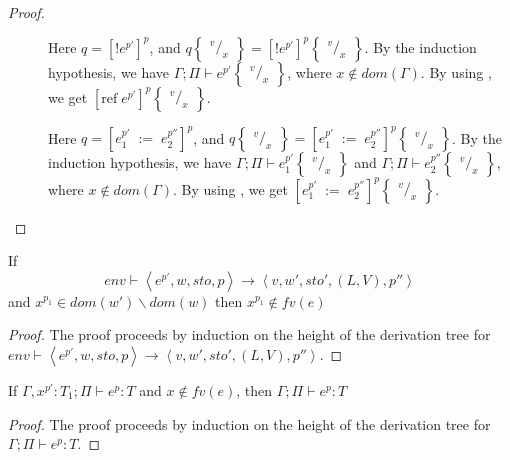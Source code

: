 \documentclass[../../master.tex]{subfiles}
\begin{document}
\begin{proof}
\begin{description}
		\item[] Here $q=[!e^{p'}]^{p}$, and $q\begin{Bmatrix} ^v/_x \end{Bmatrix}=[!e^{p'}]^{p}\begin{Bmatrix} ^v/_x \end{Bmatrix}$.
		By the induction hypothesis, we have $\Gamma;\Pi\vdash e^{p'}\begin{Bmatrix} ^v/_x \end{Bmatrix}$, where $x\notin dom(\Gamma)$.
		By using , we get $[\mbox{ref}\;e^{p'}]^{p}\begin{Bmatrix} ^v/_x \end{Bmatrix}$.

		\item[] Here $q=[e_1^{p'}\;:=\;e_2^{p''}]^{p}$, and $q\begin{Bmatrix} ^v/_x \end{Bmatrix}=[e_1^{p'}\;:=\;e_2^{p''}]^{p}\begin{Bmatrix} ^v/_x \end{Bmatrix}$.
		By the induction hypothesis, we have $\Gamma;\Pi\vdash e_1^{p'}\begin{Bmatrix} ^v/_x \end{Bmatrix}$ and $\Gamma;\Pi\vdash e_2^{p''}\begin{Bmatrix} ^v/_x \end{Bmatrix}$, where $x\notin dom(\Gamma)$.
		By using , we get $[e_1^{p'}\;:=\;e_2^{p''}]^{p}\begin{Bmatrix} ^v/_x \end{Bmatrix}$.
	\end{description}
\end{proof}
\fi

\begin{lemma}[History]\label{lemma:His}
	If 
	$$env\vdash\left\langle e^{p'},w,sto,p\right\rangle\rightarrow\left\langle v,w',sto',(L,V),p''\right\rangle$$
		and $x^{p_1}\in dom(w')\backslash dom(w)$ then $x^{p_1}\notin fv(e)$
\end{lemma}
\begin{proof}
	The proof proceeds by induction on the height of the derivation tree for $env\vdash\left\langle e^{p'},w,sto,p\right\rangle\rightarrow\left\langle v,w',sto',(L,V),p''\right\rangle$.
\end{proof}

\begin{lemma}[Strengthening]\label{lemma:Strength}
	If $\Gamma,x^{p'}:T_1;\Pi\vdash e^{p}:T$ and $x\notin fv(e)$, then $\Gamma;\Pi\vdash e^{p}:T$
\end{lemma}
\begin{proof}
	The proof proceeds by induction on the height of the derivation tree for $\Gamma;\Pi\vdash e^{p}:T$.
\end{proof}
\end{document}
